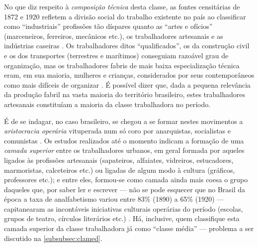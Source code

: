 No que diz respeito à \textit{composição técnica} desta classe, as fontes censitárias de 1872 e 1920 refletem a divisão social do trabalho existente no país ao classificar como ``industriais'' profissões tão díspares quanto as ``artes e ofícios'' (marceneiros, ferreiros, mecânicos etc.), os trabalhadores artesanais e as indústrias caseiras \cite[p.~141]{pinheiro_prolind_1977}. Os trabalhadores ditos ``qualificados'', os da construção civil e os dos transportes (terrestres e marítimos) conseguiam razoável grau de organização, mas os trabalhadores fabris de mais baixa especialização técnica eram, em sua maioria, mulheres e crianças, considerados por seus contemporâneos como mais difíceis de organizar \cite[p.~152]{pinheiro_prolind_1977}. É possível dizer que, dada a pequena relevância da produção fabril na vasta maioria do território brasileiro, estes trabalhadores artesanais constituíam a maioria da classe trabalhadora no período.

É de se indagar, no caso brasileiro, se chegou a se formar nestes movimentos a \textit{aristocracia operária} vituperada num só coro por anarquistas, socialistas e comunistas \cite{bakunin_contramarx_2015,engels_1892pref_1990,lenin_imperialismo_1987}. Os estudos realizados até o momento indicam a formação de uma \textit{camada superior} entre os trabalhadores urbanos, em geral formada por aqueles ligados às profissões artesanais (sapateiros, alfaiates, vidreiros, estucadores, marmoristas, calceteiros etc.) ou ligadas de algum modo à cultura (gráficos, professores etc.); e entre eles, formou-se como camada ainda mais coesa o grupo daqueles que, por saber ler e escrever --- não se pode esquecer que no Brasil da época a taxa de analfabetismo variou entre 83\% (1890) a 65\% (1920) --- capitanearam as incontáveis iniciativas culturais operárias do período (escolas, grupos de teatro, círculos literários etc.) \cite{gomes_velhos_1988,goes_formacao_1988,hardman_patripatr_2002,pinheiro_prolind_1977}. Há, inclusive, quem classifique esta camada superior da classe trabalhadora já como ``classe média'' --- problema a ser discutido na \autoref{subsubsec:clamed}.

